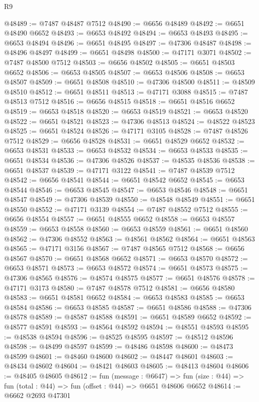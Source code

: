 \begin{lexlean}{R9}
\begin{coremodule}
@48489 := @7487 @48487 @7512
@48490 := @6656 @48489
@48492 := @6651 @48490 @6652
@48493 := @6653 @48492
@48494 := @6653 @48493
@48495 := @6653 @48494
@48496 := @6651 @48495
@48497 := @47306 @48487
@48498 := @48496 @48497
@48499 := @6651 @48498
@48500 := @47171 @3071
@48502 := @7487 @48500 @7512
@48503 := @6656 @48502
@48505 := @6651 @48503 @6652
@48506 := @6653 @48505
@48507 := @6653 @48506
@48508 := @6653 @48507
@48509 := @6651 @48508
@48510 := @47306 @48500
@48511 := @48509 @48510
@48512 := @6651 @48511
@48513 := @47171 @3088
@48515 := @7487 @48513 @7512
@48516 := @6656 @48515
@48518 := @6651 @48516 @6652
@48519 := @6653 @48518
@48520 := @6653 @48519
@48521 := @6653 @48520
@48522 := @6651 @48521
@48523 := @47306 @48513
@48524 := @48522 @48523
@48525 := @6651 @48524
@48526 := @47171 @3105
@48528 := @7487 @48526 @7512
@48529 := @6656 @48528
@48531 := @6651 @48529 @6652
@48532 := @6653 @48531
@48533 := @6653 @48532
@48534 := @6653 @48533
@48535 := @6651 @48534
@48536 := @47306 @48526
@48537 := @48535 @48536
@48538 := @6651 @48537
@48539 := @47171 @3122
@48541 := @7487 @48539 @7512
@48542 := @6656 @48541
@48544 := @6651 @48542 @6652
@48545 := @6653 @48544
@48546 := @6653 @48545
@48547 := @6653 @48546
@48548 := @6651 @48547
@48549 := @47306 @48539
@48550 := @48548 @48549
@48551 := @6651 @48550
@48552 := @47171 @3139
@48554 := @7487 @48552 @7512
@48555 := @6656 @48554
@48557 := @6651 @48555 @6652
@48558 := @6653 @48557
@48559 := @6653 @48558
@48560 := @6653 @48559
@48561 := @6651 @48560
@48562 := @47306 @48552
@48563 := @48561 @48562
@48564 := @6651 @48563
@48565 := @47171 @3156
@48567 := @7487 @48565 @7512
@48568 := @6656 @48567
@48570 := @6651 @48568 @6652
@48571 := @6653 @48570
@48572 := @6653 @48571
@48573 := @6653 @48572
@48574 := @6651 @48573
@48575 := @47306 @48565
@48576 := @48574 @48575
@48577 := @6651 @48576
@48578 := @47171 @3173
@48580 := @7487 @48578 @7512
@48581 := @6656 @48580
@48583 := @6651 @48581 @6652
@48584 := @6653 @48583
@48585 := @6653 @48584
@48586 := @6653 @48585
@48587 := @6651 @48586
@48588 := @47306 @48578
@48589 := @48587 @48588
@48591 := @6651 @48589 @6652
@48592 := @48577 @48591
@48593 := @48564 @48592
@48594 := @48551 @48593
@48595 := @48538 @48594
@48596 := @48525 @48595
@48597 := @48512 @48596
@48598 := @48499 @48597
@48599 := @48486 @48598
@48600 := @48473 @48599
@48601 := @48460 @48600
@48602 := @48447 @48601
@48603 := @48434 @48602
@48604 := @48421 @48603
@48605 := @48413 @48604
@48606 := @48405 @48605
@48612 := fun (message : @6647) =>
  fun (size : @44) => fun (total : @44) => fun (offset : @44) => @6651 @48606 @6652
@48614 := @6662 @2693 @47301

\end{coremodule}
\end{lexlean}
